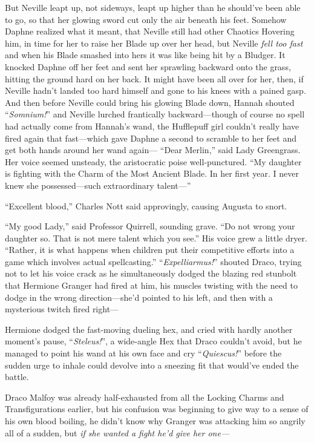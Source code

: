 But Neville leapt up, not sideways, leapt up higher than he should’ve been able
to go, so that her glowing sword cut only the air beneath his feet. Somehow
Daphne realized what it meant, that Neville still had other Chaotics Hovering
him, in time for her to raise her Blade up over her head, but Neville
\emph{fell too fast} and when his Blade smashed into hers it was like being hit
by a Bludger. It knocked Daphne off her feet and sent her sprawling backward
onto the grass, hitting the ground hard on her back. It might have been all
over for her, then, if Neville hadn’t landed too hard himself and gone to his
knees with a pained gasp. And then before Neville could bring his glowing Blade
down, Hannah shouted “\emph{Somnium!}” and Neville lurched frantically
backward—though of course no spell had actually come from Hannah’s wand, the
Hufflepuff girl couldn’t really have fired again that fast—which gave Daphne
a second to scramble to her feet and get both hands around her wand again—
\later
“Dear Merlin,” said Lady Greengrass. Her voice seemed unsteady, the
aristocratic poise well-punctured. “My daughter is fighting with the Charm of
the Most Ancient Blade. In her first year. I never knew she possessed—such
extraordinary talent—”

“Excellent blood,” Charles Nott said approvingly, causing Augusta to snort.

“My good Lady,” said Professor Quirrell, sounding grave. “Do not wrong your
daughter so. That is not mere talent which you see.” His voice grew a little
dryer. “Rather, it is what happens when children put their competitive efforts
into a game which involves actual spellcasting.”
\later
“\emph{Expelliarmus!}” shouted Draco, trying not to let his voice crack as he
simultaneously dodged the blazing red stunbolt that Hermione Granger had fired
at him, his muscles twisting with the need to dodge in the wrong
direction—she’d pointed to his left, and then with a mysterious twitch fired
right—

Hermione dodged the fast-moving dueling hex, and cried with hardly another
moment’s pause, “\emph{Steleus!}”, a wide-angle Hex that Draco couldn’t avoid,
but he managed to point his wand at his own face and cry “\emph{Quiescus!}”
before the sudden urge to inhale could devolve into a sneezing fit that
would’ve ended the battle.

Draco Malfoy was already half-exhausted from all the Locking Charms and
Transfigurations earlier, but his confusion was beginning to give way to a
sense of his own blood boiling, he didn’t know why Granger was attacking him so
angrily all of a sudden, but \emph{if she wanted a fight he’d give her one—}

